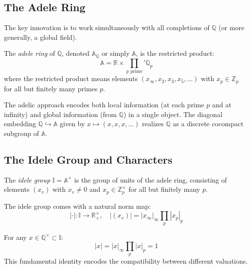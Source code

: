\subsection{The Adele Ring}

The key innovation is to work simultaneously with all completions of $\mathbb{Q}$ (or more generally, a global field).

\begin{definition}
The \emph{adele ring} of $\mathbb{Q}$, denoted $\mathbb{A}_{\mathbb{Q}}$ or simply $\mathbb{A}$, is the restricted product:
\begin{equation}
\mathbb{A} = \mathbb{R} \times \prod_{p \text{ prime}}' \mathbb{Q}_p
\end{equation}
where the restricted product means elements $(x_\infty, x_2, x_3, x_5, \ldots)$ with $x_p \in \mathbb{Z}_p$ for all but finitely many primes $p$.
\end{definition}

\begin{remark}
The adelic approach encodes both local information (at each prime $p$ and at infinity) and global information (from $\mathbb{Q}$) in a single object. The diagonal embedding $\mathbb{Q} \hookrightarrow \mathbb{A}$ given by $x \mapsto (x, x, x, \ldots)$ realizes $\mathbb{Q}$ as a discrete cocompact subgroup of $\mathbb{A}$.
\end{remark}

\subsection{The Idele Group and Characters}

\begin{definition}
The \emph{idele group} $\mathbb{I} = \mathbb{A}^{\times}$ is the group of units of the adele ring, consisting of elements $(x_v)$ with $x_v \neq 0$ and $x_p \in \mathbb{Z}_p^{\times}$ for all but finitely many $p$.
\end{definition}

The idele group comes with a natural norm map:
\begin{equation}
|\cdot| : \mathbb{I} \to \mathbb{R}_+^{\times}, \quad |(x_v)| = |x_\infty|_\infty \prod_p |x_p|_p
\end{equation}

\begin{theorem}
For any $x \in \mathbb{Q}^{\times} \subset \mathbb{I}$:
\begin{equation}
|x| = |x|_\infty \prod_p |x|_p = 1
\end{equation}
This fundamental identity encodes the compatibility between different valuations.
\end{theorem}

